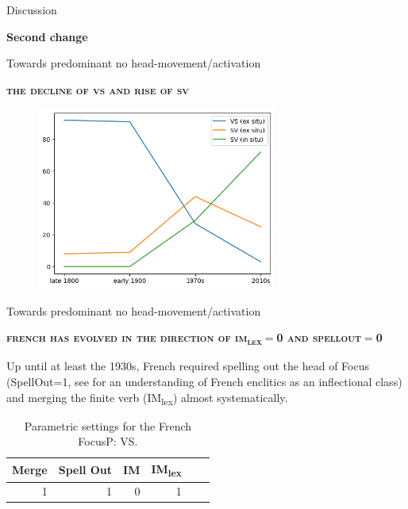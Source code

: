 \documentclass[lesson_slides]{subfiles}
\begin{document}
\begin{frame}[c]{Discussion}
    
\begin{center}
    \textbf{Second change}
\end{center}
  
\end{frame}

\begin{frame}[c]{Towards predominant no head-movement/activation}

    \textbf{\textsc{the decline of vs and rise of sv}}
    \begin{center}
        \includegraphics[width=10cm, height=6cm]{images/exsituinsitu.png}
    \end{center}
  
\end{frame}
\begin{frame}[c]{Towards predominant no head-movement/activation}

    \textbf{\textsc{french has evolved in the direction of im\textsubscript{lex}$=$0 and spellout$=$0}} \pause

    \noindent Up until at least the 1930s, French required spelling out the head of Focus (SpellOut=1, see \cite{roberts2017} for an understanding of French enclitics as an inflectional class) and merging the finite verb (IM\textsubscript{lex}) almost systematically. \pause

    \begin{table}[H]
        \centering
        \begin{tabular}{|r|r|r|r|r|r|}
        \hline
        Merge & Spell Out & IM  & IM\textsubscript{lex} \\
        \hline
        1 & 1 & 0 & 1 \\
        \hline
        \end{tabular}
        \caption{\label{tab:samp}Parametric settings for the French FocusP: VS.}
    \end{table}
  
\end{frame}
\end{document}
